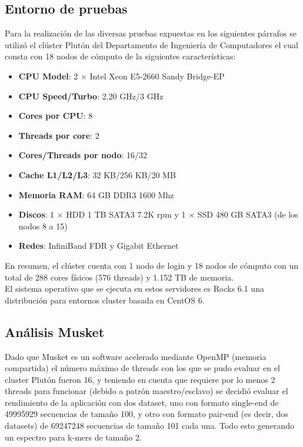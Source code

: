 \documentclass[conference]{IEEEtran}
\begin{document}
\subsection{Entorno de pruebas}
Para la realización de las diversas pruebas expuestas en los siguientes párrafos se utilizó el clúster Plutón del Departamento de Ingeniería de Computadores el cual consta con 18 nodos de cómputo de la siguientes características:\\ 

\begin{itemize}
	\item \textbf{CPU Model}: 2 × Intel Xeon E5-2660 Sandy Bridge-EP
	\item \textbf{CPU Speed/Turbo}: 2.20 GHz/3 GHz
	\item \textbf{Cores por CPU}: 8
	\item \textbf{Threads por core}: 2
	\item \textbf{Cores/Threads por nodo}: 16/32
	\item \textbf{Cache L1/L2/L3}: 32 KB/256 KB/20 MB
	\item \textbf{Memoria RAM}: 64 GB DDR3 1600 Mhz
	\item \textbf{Discos}: 1 × HDD 1 TB SATA3 7.2K rpm y 1 × SSD 480 GB SATA3 (de los nodos 8 a 15)
	\item \textbf{Redes}: InfiniBand FDR y Gigabit Ethernet\\
\end{itemize}

En resumen, el clúster cuenta con 1 nodo de login y 18 nodos de cómputo con un total de 288 cores físicos (576 threads) y 1.152 TB de memoria.\\

El sistema operativo que se ejecuta en estos servidores es Rocks 6.1 una distribución para entornos cluster basada en CentOS 6.

\subsection{Análisis Musket}
Dado que Musket es un software acelerado mediante OpenMP (memoria compartida) el número máximo de threads con los que se pudo evaluar en el cluster Plutón fueron 16, y teniendo en cuenta que requiere por lo menos 2 threads para funcionar (debido a patrón maestro/esclavo) se decidió evaluar el rendimiento de la aplicación con dos dataset, uno con formato single-end de 49995929 secuencias de tamaño 100, y otro con formato pair-end (es decir, dos datasets) de 69247248 secuencias de tamaño 101 cada una. Todo esto generando un espectro para k-mers de tamaño 2.\\
\end{document}
